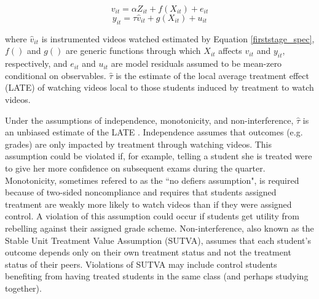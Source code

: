 \documentclass[12pt]{article}
\begin{document}
\begin{equation} \label{firststage_spec}
	v_{it} = \alpha Z_{it} + f(X_{it}) + e_{it}
\end{equation}
\begin{equation} \label{secondstage}
	y_{it} = \tau \hat{v}_{it} + g(X_{it}) + u_{it}
\end{equation}

where $\hat{v}_{it}$ is instrumented videos watched estimated by Equation \ref{firststage_spec}, $f()$ and $g()$ are generic functions through which $X_{it}$ affects $v_{it}$ and $y_{it}$, respectively, and $e_{it}$ and $u_{it}$ are model residuals assumed to be mean-zero conditional on observables. $\hat{\tau}$ is the estimate of the local average treatment effect (LATE) of watching videos local to those students induced by treatment to watch videos.

Under the assumptions of independence, monotonicity, and non-interference, $\hat{\tau}$ is an unbiased estimate of the LATE \parencite{ai1995}. Independence assumes that outcomes (e.g. grades) are only impacted by treatment through watching videos. This assumption could be violated if, for example, telling a student she is treated were to give her more confidence on subsequent exams during the quarter. Monotonicity, sometimes refered to as the ``no defiers assumption", is required because of two-sided noncompliance and requires that students assigned treatment are weakly more likely to watch videos than if they were assigned control. A violation of this assumption could occur if students get utility from rebelling against their assigned grade scheme. Non-interference, also known as the Stable Unit Treatment Value Assumption (SUTVA), assumes that each student's outcome depends only on their own treatment status and not the treatment status of their peers. Violations of SUTVA may include control students benefiting from having treated students in the same class (and perhaps studying together).
\end{document}

